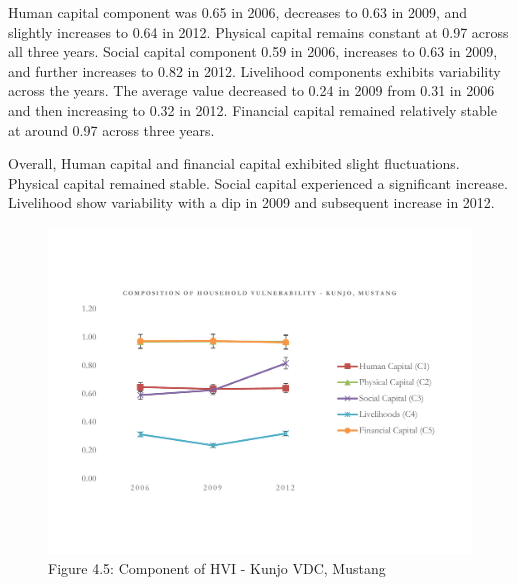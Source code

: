 \documentclass[12pt, a4paper]{article}
\begin{document}
Human capital component was 0.65 in 2006, decreases to 0.63 in 2009, and slightly increases to 0.64 in 2012. Physical capital remains constant at 0.97 across all three years. Social capital component 0.59 in 2006, increases to 0.63 in 2009, and further increases to 0.82 in 2012. Livelihood components exhibits variability across the years. The average value decreased to 0.24 in 2009 from 0.31 in 2006 and then increasing to 0.32 in 2012. Financial capital remained relatively stable at around 0.97 across three years. 

Overall, Human capital and financial capital exhibited slight fluctuations. Physical capital remained stable. Social capital experienced a significant increase. Livelihood show variability with a dip in 2009 and subsequent increase in 2012.     	
\begin{figure}[ht]
	\vspace{-40pt}
	\includegraphics[scale=0.6]{HVI_Component_Kunjo1.pdf}
	\vspace{-50pt}
	\captionsetup{labelformat=empty}
	\caption{Figure 4.5: Component of HVI - Kunjo VDC, Mustang}
	\setlength{\abovecaptionskip}{4pt}
	\label{fig:hvikunjocomponents}
\end{figure}
\end{document}
